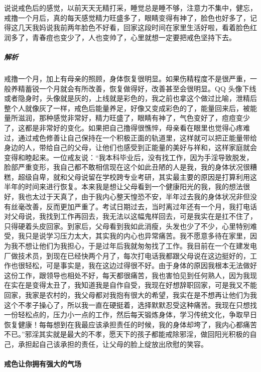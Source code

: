 \begin{case}
    说说戒色后的感觉，以前天天无精打采，睡觉总是睡不够，注意力不集中，健忘，戒撸一个月后，真的每天感觉精力旺盛多了，眼睛变得有神了，脸色也好多了，记得这几天我妈说我前两年脸色不好看，回家这段时间在家里生活好啦，看着脸色红润多了，青春痘也变少了，人也变帅了，心里就想一定要把戒色坚持下去。
    \subparagraph{解析} 戒撸一个月，加上有母亲的照顾，身体恢复很明显。如果伤精程度不是很严重，一般养精蓄锐一个月就会有所改善，恢复做得好，改善甚至会很明显。QQ 头像下线或者隐身时，头像就是灰的，上线就是彩色的，我之前也拿这个做过比喻，泄精后整个人就像灰了一样，戒色后能量养足，好像又变成彩色的了，能量回来后，被能量所滋润，那种感觉非常好，精力旺盛了，眼睛有神了，气色变好了，痘痘变少了，这都是非常好的变化。如果把自己撸得很憔悴，母亲看在眼里也觉得心疼难过，通过戒色修善让自己保持在一个积极正面的轨道里，这样就可以把正能量带给身边的人，带给自己的父母，让他们也感受到正能量的美好与祥和，这样家庭就会变得和睦起来。一位戒友说：“我本科毕业后，没有找工作，因为手淫导致脱发，脸部严重变形，我自己都不敢相信现在这个如此丑陋的人是我，我的身体状况很糟糕，超级自卑，就和父母说留在学校跨专业考研，其实最主要的原因是打算利用这半年的时间来进行恢复。本来我是想让父母看到一个健康阳光的我，我的想法很好，我也太过于天真了，由于我内心整天惶恐不安，半年过去我的身体状况非但没有丝毫改善，反而更加严重了。考试日期过去，当时离过年还有一个月，我打电话对父母说，我找到工作再回去，我无法以这幅鬼样回去，可是我实在是扛不住了，只得硬着头皮回家。到家后，父母看到我如此消瘦，头发也少了不少，心里特别难受，我只是说学习压力太大，其实我的内心也异常痛苦。我不愿意多待在家里，因为我不想让他们为我担心，于是过年后我就匆匆找了工作。我目前在一个在建发电厂做技术员，到现在已经快两个月了，每次打电话我都跟父母说在这边挺好的，工作也很轻松，可是事实是，我在这边过得很不好。由于身体的原因我根本无法做好这份工作，跟领导也相处不好，每天都很痛苦，我也害怕见到任何熟人，因为我现在实在是变得太丑了，我知道我是自作自受，我现在好想辞职回家，可是我又不能回家，我家是农村的，我父母都对我抱有很大的希望，我实在是不想再让他们为我这个不孝子操心了，所以我一直在硬挺着，选择默默忍受这种痛苦。我现在只想找一份轻松点的，压力小一点的工作，然后每天锻炼身体，学习传统文化，争取早日恢复健康！每每想到在我最应该承担责任的时候，我的身体却垮了，我内心都痛苦不已。”邪淫其实就是最大的不孝，愿天下的孩子都能戒除邪淫，做回阳光积极的自己，承担起自己该承担的责任，让父母的脸上绽放出欣慰的笑容。
\end{case}

\paragraph{戒色让你拥有强大的气场}

